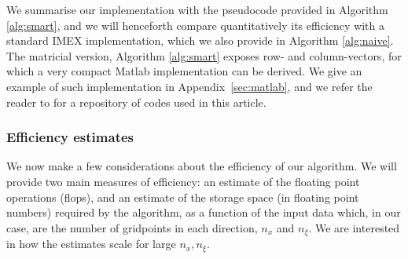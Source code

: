 \documentclass[a4paper,final]{siamart190516}
\begin{document}
We summarise our implementation with the pseudocode provided in Algorithm
\ref{alg:smart}, and we will henceforth compare quantitatively its efficiency with
a standard IMEX implementation, which we also provide in Algorithm \ref{alg:naive}. The
matricial version, Algorithm \ref{alg:smart} exposes row- and column-vectors, for
which a very compact Matlab implementation can be derived. We give an example of such
implementation in Appendix~\ref{sec:matlab}, and we refer the reader to
\cite{avitabile2020neuralcodes} 
for a repository of codes used in this article.

\subsubsection{Efficiency estimates}

We now make a few considerations about the efficiency of our algorithm. We will provide
two main measures of efficiency: an estimate of the floating point operations (flops),
and an estimate of the storage space (in floating point numbers) required by the
algorithm, as a function of the input data which, in our case, are the number of
gridpoints in each direction, $n_x$ and $n_\xi$. We are  interested
in how the estimates scale for large $n_x, n_\xi$.
\end{document}
